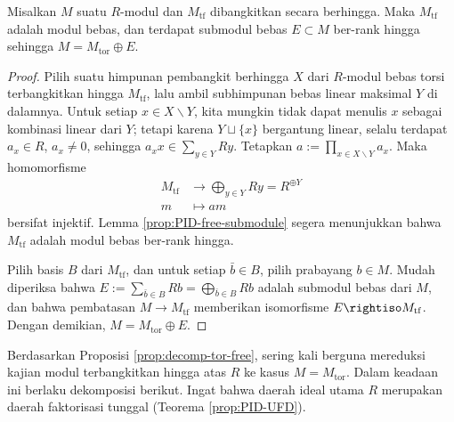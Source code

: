 \begin{proposition}\label{prop:decomp-tor-free}
	Misalkan $M$ suatu $R$-modul dan $M_\text{tf}$ dibangkitkan secara berhingga. Maka $M_\text{tf}$ adalah modul bebas, dan terdapat submodul bebas $E \subset M$ ber-rank hingga sehingga $M = M_\text{tor} \oplus E$.
\end{proposition}
\begin{proof}
	Pilih suatu himpunan pembangkit berhingga $X$ dari $R$-modul bebas torsi terbangkitkan hingga $M_\text{tf}$, lalu ambil subhimpunan bebas linear maksimal $Y$ di dalamnya. Untuk setiap $x \in X \smallsetminus Y$, kita mungkin tidak dapat menulis $x$ sebagai kombinasi linear dari $Y$; tetapi karena $Y \sqcup \{x\}$ bergantung linear, selalu terdapat $a_x \in R$, $a_x \neq 0$, sehingga $a_x x \in \sum_{y \in Y} Ry$. Tetapkan $a := \prod_{x \in X \smallsetminus Y} a_x$. Maka homomorfisme
	\begin{align*}
		M_\text{tf} & \longrightarrow \bigoplus_{y \in Y} Ry = R^{\oplus Y} \\
		m & \longmapsto am
	\end{align*}
	bersifat injektif. Lemma \ref{prop:PID-free-submodule} segera menunjukkan bahwa $M_\text{tf}$ adalah modul bebas ber-rank hingga.

	Pilih basis $B$ dari $M_\text{tf}$, dan untuk setiap $\bar{b} \in B$, pilih prabayang $b \in M$. Mudah diperiksa bahwa $E := \sum_{\bar{b} \in B} Rb = \bigoplus_{\bar{b} \in B} Rb$ adalah submodul bebas dari $M$, dan bahwa pembatasan $M \to M_\text{tf}$ memberikan isomorfisme $E \rightiso M_\text{tf}$. Dengan demikian, $M = M_\text{tor} \oplus E$.
\end{proof}

Berdasarkan Proposisi \ref{prop:decomp-tor-free}, sering kali berguna mereduksi kajian modul terbangkitkan hingga atas $R$ ke kasus $M = M_\text{tor}$. Dalam keadaan ini berlaku dekomposisi berikut. Ingat bahwa daerah ideal utama $R$ merupakan daerah faktorisasi tunggal (Teorema \ref{prop:PID-UFD}).


